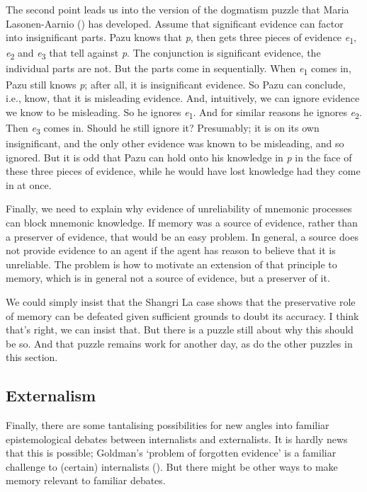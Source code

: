 \documentclass[
  11pt,
  letterpaper,
  DIV=11,
  numbers=noendperiod,
  twoside]{scrartcl}
\begin{document}
The second point leads us into the version of the dogmatism puzzle that
Maria Lasonen-Aarnio () has
developed. Assume that significant evidence can factor into
insignificant parts. Pazu knows that \emph{p}, then gets three pieces of
evidence \emph{e}\textsubscript{1}, \emph{e}\textsubscript{2} and
\emph{e}\textsubscript{3} that tell against \emph{p}. The conjunction is
significant evidence, the individual parts are not. But the parts come
in sequentially. When \emph{e}\textsubscript{1} comes in, Pazu still
knows \emph{p}; after all, it is insignificant evidence. So Pazu can
conclude, i.e., know, that it is misleading evidence. And, intuitively,
we can ignore evidence we know to be misleading. So he ignores
\emph{e}\textsubscript{1}. And for similar reasons he ignores
\emph{e}\textsubscript{2}. Then \emph{e}\textsubscript{3} comes in.
Should he still ignore it? Presumably; it is on its own insignificant,
and the only other evidence was known to be misleading, and so ignored.
But it is odd that Pazu can hold onto his knowledge in \emph{p} in the
face of these three pieces of evidence, while he would have lost
knowledge had they come in at once.

Finally, we need to explain why evidence of unreliability of mnemonic
processes can block mnemonic knowledge. If memory was a source of
evidence, rather than a preserver of evidence, that would be an easy
problem. In general, a source does not provide evidence to an agent if
the agent has reason to believe that it is unreliable. The problem is
how to motivate an extension of that principle to memory, which is in
general not a source of evidence, but a preserver of it.

We could simply insist that the Shangri La case shows that the
preservative role of memory can be defeated given sufficient grounds to
doubt its accuracy. I think that's right, we can insist that. But there
is a puzzle still about why this should be so. And that puzzle remains
work for another day, as do the other puzzles in this section.

\subsection{Externalism}\label{externalism}

Finally, there are some tantalising possibilities for new angles into
familiar epistemological debates between internalists and externalists.
It is hardly news that this is possible; Goldman's `problem of forgotten
evidence' is a familiar challenge to (certain) internalists
(). But there might be other
ways to make memory relevant to familiar debates.
\end{document}
